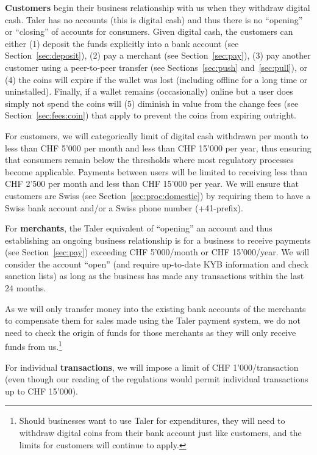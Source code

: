 \documentclass[10pt,a4paper,oneside]{book}
\begin{document}
{\bf Customers} begin their business relationship with us when they withdraw
digital cash.  Taler has no accounts (this is digital cash) and thus there is
no ``opening'' or ``closing'' of accounts for consumers.  Given digital cash,
the customers can either (1) deposit the funds explicitly into a bank account
(see Section~\ref{sec:deposit}), (2) pay a merchant (see
Section~\ref{sec:pay}), (3) pay another customer using a peer-to-peer
transfer (see Sections~\ref{sec:push} and~\ref{sec:pull}), or (4) the coins
will expire if the wallet was lost (including offline for a long time or
uninstalled).  Finally, if a wallet remains (occasionally) online but a user
does simply not spend the coins will (5) diminish in value from the change
fees (see Section~\ref{sec:fees:coin}) that apply to prevent the coins from
expiring outright.

For customers, we will categorically limit of digital cash withdrawn per month
to less than CHF 5'000 per month and less than CHF 15'000 per year, thus
ensuring that consumers remain below the thresholds where most regulatory
processes become applicable.  Payments between users will be limited
to receiving less than CHF 2'500 per month and less than CHF 15'000 per year.
We will ensure that customers are Swiss
(see Section~\ref{sec:proc:domestic}) by requiring them to have a Swiss bank
account and/or a Swiss phone number (+41-prefix).

For {\bf merchants}, the Taler equivalent of ``opening'' an account and thus
establishing an ongoing business relationship is for a business to receive
payments (see Section~\ref{sec:pay}) exceeding CHF 5'000/month or CHF
15'000/year.  We will consider the account ``open'' (and require up-to-date KYB
information and check sanction lists) as long as the business has made any
transactions within the last 24 months.

As we will only transfer money into the existing bank accounts of the
merchants to compensate them for sales made using the Taler payment system, we
do not need to check the origin of funds for those merchants as they will only
receive funds from us.\footnote{Should businesses want to use Taler for
expenditures, they will need to withdraw digital coins from their bank account
just like customers, and the limits for customers will continue to apply.}

For individual {\bf transactions}, we will impose a limit of CHF
1'000/transaction (even though our reading of the regulations would permit
individual transactions up to CHF 15'000).
\end{document}
